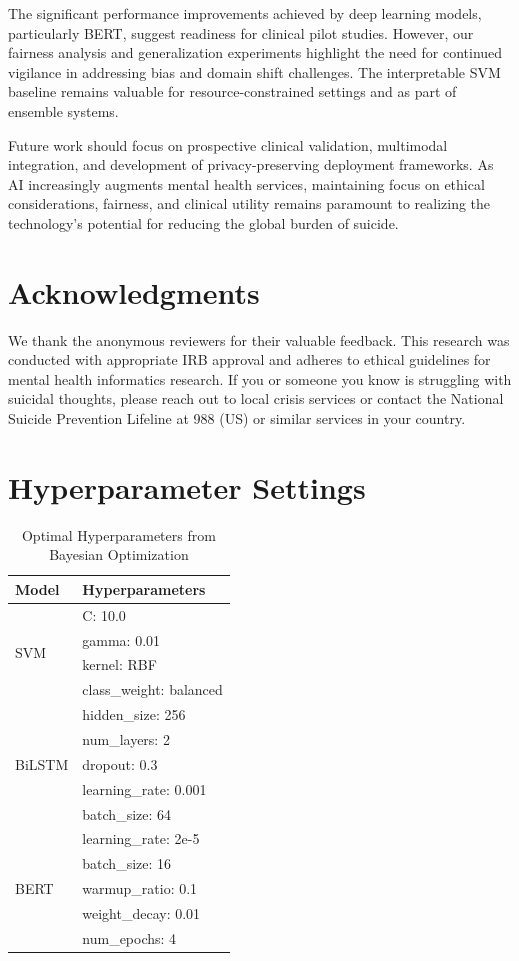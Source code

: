 \documentclass[conference]{IEEEtran}
\begin{document}
The significant performance improvements achieved by deep learning models, particularly BERT, suggest readiness for clinical pilot studies. However, our fairness analysis and generalization experiments highlight the need for continued vigilance in addressing bias and domain shift challenges. The interpretable SVM baseline remains valuable for resource-constrained settings and as part of ensemble systems.

Future work should focus on prospective clinical validation, multimodal integration, and development of privacy-preserving deployment frameworks. As AI increasingly augments mental health services, maintaining focus on ethical considerations, fairness, and clinical utility remains paramount to realizing the technology's potential for reducing the global burden of suicide.

\section{Acknowledgments}

We thank the anonymous reviewers for their valuable feedback. This research was conducted with appropriate IRB approval and adheres to ethical guidelines for mental health informatics research. If you or someone you know is struggling with suicidal thoughts, please reach out to local crisis services or contact the National Suicide Prevention Lifeline at 988 (US) or similar services in your country.




\appendix

\section{Hyperparameter Settings}
\label{app:hyperparameters}

\begin{table}[H]
\centering
\caption{Optimal Hyperparameters from Bayesian Optimization}
\begin{tabular}{ll}
\toprule
\textbf{Model} & \textbf{Hyperparameters} \\
\midrule
\multirow{4}{*}{SVM} & C: 10.0 \\
 & gamma: 0.01 \\
 & kernel: RBF \\
 & class\_weight: balanced \\
\midrule
\multirow{5}{*}{BiLSTM} & hidden\_size: 256 \\
 & num\_layers: 2 \\
 & dropout: 0.3 \\
 & learning\_rate: 0.001 \\
 & batch\_size: 64 \\
\midrule
\multirow{5}{*}{BERT} & learning\_rate: 2e-5 \\
 & batch\_size: 16 \\
 & warmup\_ratio: 0.1 \\
 & weight\_decay: 0.01 \\
 & num\_epochs: 4 \\
\bottomrule
\end{tabular}
\end{table}
\end{document}

